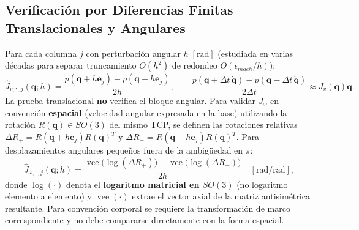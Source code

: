 \documentclass[10pt, a4paper]{article}
\begin{document}
\subsection{Verificación por Diferencias Finitas Translacionales y Angulares}
Para cada columna $j$ con perturbación angular $h\;[\mathrm{rad}]$ (estudiada en varias décadas para separar truncamiento $O(h^2)$ de redondeo $O(\epsilon_{mach}/h)$):
\begin{equation}
    \widehat{J}_{v,:,j}(\mathbf{q}; h) = \frac{p(\mathbf{q} + h\mathbf{e}_j) - p(\mathbf{q} - h\mathbf{e}_j)}{2h}, \qquad
    \frac{p(\mathbf{q} + \Delta t\,\dot{\mathbf{q}}) - p(\mathbf{q} - \Delta t\,\dot{\mathbf{q}})}{2\Delta t} \approx J_v(\mathbf{q})\dot{\mathbf{q}}.
    \label{eq:jac_fd_lin}
\end{equation}
La prueba translacional \textbf{no} verifica el bloque angular. Para validar $J_\omega$ en convención \textbf{espacial} (velocidad angular expresada en la base) utilizando la rotación $R(\mathbf{q}) \in SO(3)$ del mismo TCP, se definen las rotaciones relativas $\Delta R_+ = R(\mathbf{q} + h\mathbf{e}_j)R(\mathbf{q})^T$ y $\Delta R_- = R(\mathbf{q} - h\mathbf{e}_j)R(\mathbf{q})^T$. Para desplazamientos angulares pequeños fuera de la ambigüedad en $\pi$:
\begin{equation}
    \boxed{ \widehat{J}_{\omega,:,j}(\mathbf{q}; h) = \frac{\operatorname{vee}\!\big(\log(\Delta R_+)\big) - \operatorname{vee}\!\big(\log(\Delta R_-)\big)}{2h} \quad [\mathrm{rad/rad}] },
    \label{eq:jac_fd_ang}
\end{equation}
donde $\log(\cdot)$ denota el \textbf{logaritmo matricial en $SO(3)$} (no logaritmo elemento a elemento) y $\operatorname{vee}(\cdot)$ extrae el vector axial de la matriz antisimétrica resultante. Para convención corporal se requiere la transformación de marco correspondiente y no debe compararse directamente con la forma espacial.
\end{document}

